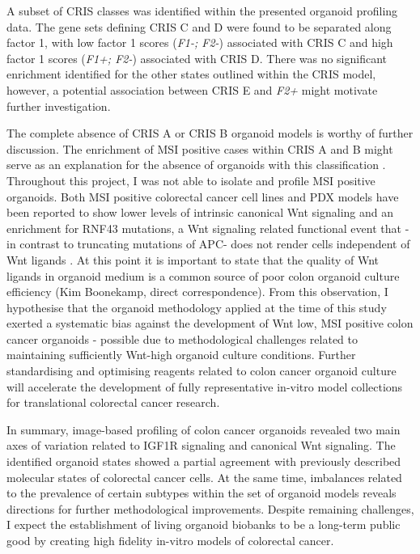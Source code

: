 \begin{flushleft}
A subset of CRIS classes was identified within the presented organoid profiling data. The gene sets defining CRIS C and D were found to be separated along factor 1, with low factor 1 scores (\textit{F1-; F2-}) associated with CRIS C and high factor 1 scores (\textit{F1+; F2-}) associated with CRIS D. There was no significant enrichment identified for the other states outlined within the CRIS model, however, a potential association between CRIS E and \textit{F2+} might motivate further investigation.

The complete absence of CRIS A or CRIS B organoid models is worthy of further discussion. The enrichment of MSI positive cases within CRIS A and B might serve as an explanation for the absence of organoids with this classification \citep{isellaSelectiveAnalysisCancercell2017a}. Throughout this project, I was not able to isolate and profile MSI positive organoids. Both MSI positive colorectal cancer cell lines \citep{imkellerMetabolicBalanceColorectal2022} and PDX models \citep{isellaSelectiveAnalysisCancercell2017a} have been reported to show lower levels of intrinsic canonical Wnt signaling and an enrichment for RNF43 mutations, a Wnt signaling related functional event that -in contrast to truncating mutations of APC- does not render cells independent of Wnt ligands \citep{vandeweteringProspectiveDerivationLiving2015}. At this point it is important to state that the quality of Wnt ligands in organoid medium is a common source of poor colon organoid culture efficiency (Kim Boonekamp, direct correspondence). From this observation, I hypothesise that the organoid methodology applied at the time of this study exerted a systematic bias against the development of Wnt low, MSI positive colon cancer organoids - possible due to methodological challenges related to maintaining sufficiently Wnt-high organoid culture conditions. Further standardising and optimising reagents related to colon cancer organoid culture will accelerate the development of fully representative in-vitro model collections for translational colorectal cancer research. 

In summary, image-based profiling of colon cancer organoids revealed two main axes of variation related to IGF1R signaling and canonical Wnt signaling. The identified organoid states showed a partial agreement with previously described molecular states of colorectal cancer cells. At the same time, imbalances related to the prevalence of certain subtypes within the set of organoid models reveals directions for further methodological improvements. Despite remaining challenges, I expect the establishment of living organoid biobanks to be a long-term public good by creating high fidelity in-vitro models of colorectal cancer. 


\end{flushleft}
